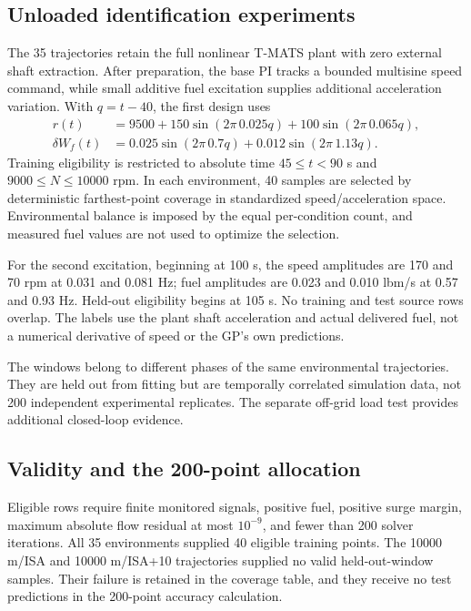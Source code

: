 \documentclass[11pt,a4paper]{article}
\begin{document}
\subsection{Unloaded identification experiments}
The 35 trajectories retain the full nonlinear T-MATS plant with zero external shaft extraction. After preparation, the base PI tracks a bounded multisine speed command, while small additive fuel excitation supplies additional acceleration variation. With $q=t-40$, the first design uses
\begin{align}
r(t)&=9500+150\sin(2\pi\,0.025q)+100\sin(2\pi\,0.065q),\\
\delta W_f(t)&=0.025\sin(2\pi\,0.7q)+0.012\sin(2\pi\,1.13q).
\end{align}
Training eligibility is restricted to absolute time $45\leq t<90$ s and $9000\leq N\leq10000$ rpm. In each environment, 40 samples are selected by deterministic farthest-point coverage in standardized speed/acceleration space. Environmental balance is imposed by the equal per-condition count, and measured fuel values are not used to optimize the selection.

For the second excitation, beginning at 100 s, the speed amplitudes are 170 and 70 rpm at 0.031 and 0.081 Hz; fuel amplitudes are 0.023 and 0.010 lbm/s at 0.57 and 0.93 Hz. Held-out eligibility begins at 105 s. No training and test source rows overlap. The labels use the plant shaft acceleration and actual delivered fuel, not a numerical derivative of speed or the GP's own predictions.

The windows belong to different phases of the same environmental trajectories. They are held out from fitting but are temporally correlated simulation data, not 200 independent experimental replicates. The separate off-grid load test provides additional closed-loop evidence.

\subsection{Validity and the 200-point allocation}
Eligible rows require finite monitored signals, positive fuel, positive surge margin, maximum absolute flow residual at most $10^{-9}$, and fewer than 200 solver iterations. All 35 environments supplied 40 eligible training points. The 10000 m/ISA and 10000 m/ISA+10 trajectories supplied no valid held-out-window samples. Their failure is retained in the coverage table, and they receive no test predictions in the 200-point accuracy calculation.
\end{document}
